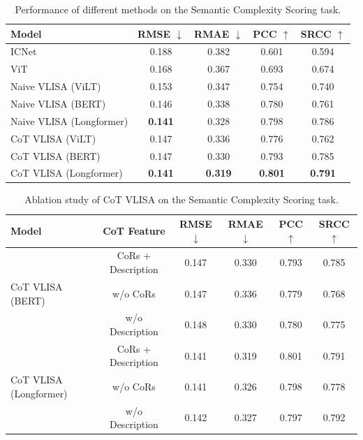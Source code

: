 \begin{table}[h]
    \centering
    \begin{tabular}{l|cccc}
    \toprule
    Model & RMSE  $\downarrow$ &  RMAE  $\downarrow$ &  PCC $\uparrow$ &  SRCC $\uparrow$ \\
    \midrule 
    ICNet & 0.188 & 0.382 & 0.601 & 0.594 \\  %
    ViT & 0.168 & 0.367 & 0.693 & 0.674  \\
    Naive VLISA (ViLT) & 0.153 & 0.347 & 0.754 & 0.740  \\ %
    Naive VLISA (BERT) & 0.146 & 0.338 & 0.780 & 0.761  \\
    Naive VLISA (Longformer) & \textbf{0.141} & 0.328 & 0.798 & 0.786  \\
    CoT VLISA (ViLT) & 0.147 & 0.336 & 0.776 & 0.762  \\ %
    CoT VLISA (BERT) & 0.147 & 0.330 & 0.793 & 0.785  \\
    CoT VLISA (Longformer) & \textbf{0.141} & \textbf{0.319} & \textbf{0.801} & \textbf{0.791}  \\
    \bottomrule
\end{tabular}
\caption{Performance of different methods on the Semantic Complexity Scoring task.}
\label{semantic_reg}
\end{table}


\begin{table}[h]
    \centering
    \begin{tabular}{l|c|cccc}
    \toprule
    Model & CoT Feature & RMSE $\downarrow$ &  RMAE $\downarrow$ &  PCC $\uparrow$ &  SRCC $\uparrow$ \\
    \midrule 
                     & CoRs + Description & 0.147 & 0.330 & 0.793 & 0.785  \\
    CoT VLISA (BERT) & w/o CoRs & 0.147 & 0.336 & 0.779 & 0.768 \\
                     & w/o Description & 0.148 & 0.330 & 0.780 & 0.775 \\
    \hline
                           & CoRs + Description & 0.141 & 0.319 & 0.801 & 0.791  \\
    CoT VLISA (Longformer) & w/o CoRs & 0.141 & 0.326 & 0.798 & 0.778 \\
                           & w/o Description & 0.142 & 0.327 & 0.797 & 0.792 \\
    \bottomrule
\end{tabular}
\caption{Ablation study of CoT VLISA on the Semantic Complexity Scoring task.}
\label{ablation}
\end{table}



